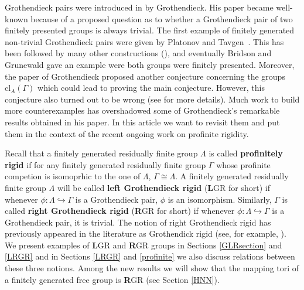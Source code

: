 \documentclass{amsart}
\theoremstyle{definition}
\theoremstyle{remark}
\begin{document}
Grothendieck pairs were introduced in \cite{Gr70} by Grothendieck.  His paper became well-known because of a proposed  question as to whether a Grothendieck pair of two finitely presented groups is always trivial. 
The first example of finitely generated non-trivial Grothendieck pairs were given by Platonov and Tavgen\textquotesingle\  \cite{PT86}. This has been followed  by many other constructions (\cite{BL00,Py04, KS23}), and eventually  Bridson and Grunewald \cite{BG04} gave an example were both groups were finitely presented. Moreover, the paper of Grothendieck proposed another conjecture concerning  the groups $\mathrm {cl}_A(\Gamma)$ which could lead to proving the main conjecture. However, this conjecture also  turned out to be wrong (see \cite{Lu79, LV19} for more details). Much work to build more counterexamples has overshadowed some of Grothendieck's remarkable results obtained in his paper. In this article we want to revisit  them and put them in the context of the recent ongoing work on profinite rigidity. 


 
Recall that a  finitely generated residually finite group $\Lambda$ is called {\bf profinitely rigid} if for any finitely generated residually finite group $\Gamma$ whose profinite competion is isomoprhic to the one of $\Lambda$, $\Gamma\cong \Lambda$.
A finitely generated residually finite group $\Lambda$ will be called 
{\bf   left Grothendieck  rigid} ({\textbf L}GR for short) if whenever $\phi:\Lambda \hookrightarrow \Gamma$ is a
 Grothendieck pair,  $\phi$ is an isomorphism. Similarly, $\Gamma$ is called {\bf   right Grothendieck  rigid}  ({\textbf R}GR for short) if whenever 
$\phi:\Lambda \hookrightarrow \Gamma$ is a Grothendieck pair, it is trivial.
The notion of right Grothendieck rigid has previously  appeared in the literature as Grothendick rigid (see, for example, \cite{ReAndrews, ReICM}). We present  examples of {\textbf L}GR and {\textbf R}GR groups  in Sections \ref{GLRsection} and  \ref{LRGR} and in Sections   \ref{LRGR} and \ref{profinite}   we also discuss  relations between these three notions. Among  the new results we will show that the mapping tori of a finitely generated free group is {\textbf R}GR (see   Section \ref{HNN}).
\end{document}
